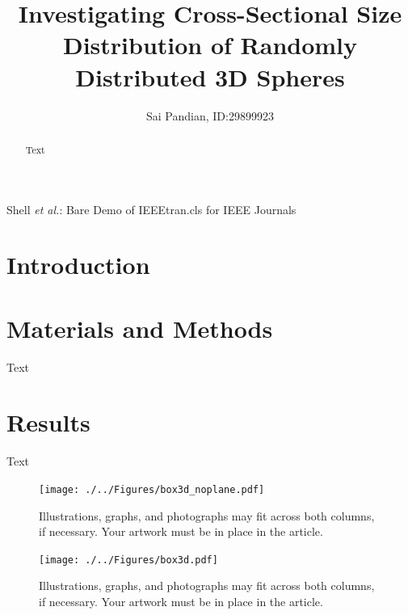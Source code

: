 \documentclass[journal]{IEEEtran}
\begin{document}
\title{Investigating Cross-Sectional Size Distribution of Randomly Distributed 3D Spheres}

\author{Sai Pandian, ID:\@ 29899923}%
        
{Shell \MakeLowercase{\textit{et al.}}: Bare Demo of IEEEtran.cls for IEEE Journals}

\maketitle

\begin{abstract}
  Text
\end{abstract}

\section{Introduction}


\section{Materials and Methods}
Text


\section{Results}
Text

\begin{figure}[H]%
\begin{center}
\texttt{[image: ./../Figures/box3d\_noplane.pdf]}
\caption{Illustrations, graphs, and photographs may fit across both columns, if
  necessary. Your artwork must be in place in the article.}
\label{fig:3dplot}
\end{center}
\end{figure}

\begin{figure}[H]%
\begin{center}
\texttt{[image: ./../Figures/box3d.pdf]}
\caption{Illustrations, graphs, and photographs may fit across both columns, if
  necessary. Your artwork must be in place in the article.}
\label{fig:3dplot_plane}
\end{center}
\end{figure}
\end{document}
